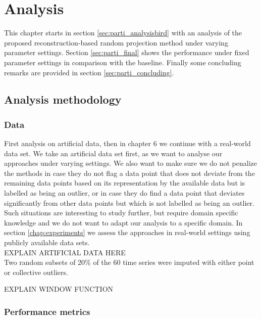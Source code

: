 \chapter{Analysis}
\label{chap:analysis}

This chapter starts in section \ref{sec:parti_analysisbird} with an analysis of the proposed reconstruction-based random projection method under varying parameter settings. Section \ref{sec:parti_final} shows the performance under fixed parameter settings in comparison with the baseline. Finally some concluding remarks are provided in section \ref{sec:parti_concluding}.


\section{Analysis methodology}
\label{sec:analysis_methodology}
\subsection{Data}
First analysis on artificial data, then in chapter 6 we continue with a real-world data set. We take an artificial data set first, as we want to analyse our approaches under varying settings. We also want to make sure we do not penalize the methods in case they do not flag a data point that does not deviate from the remaining data points based on its representation by the available data but is labelled as being an outlier, or in case they do find a data point that deviates significantly from other data points but which is not labelled as being an outlier. Such situations are interesting to study further, but require domain specific knowledge and we do not want to adapt our analysis to a specific domain. In section \ref{chap:experiments} we assess the approaches in real-world settings using publicly available data sets.\\

EXPLAIN ARTIFICIAL DATA HERE\\

Two random subsets of 20\% of the 60 time series were imputed with either point or collective outliers. 

EXPLAIN WINDOW FUNCTION\\


\subsection{Performance metrics}

